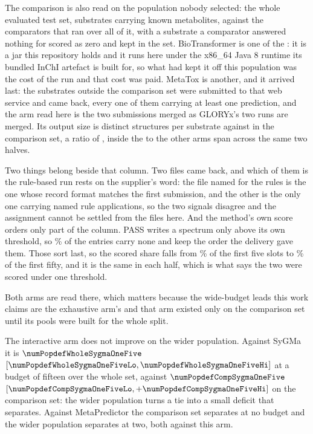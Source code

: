 \documentclass[journal=jcisd8,manuscript=suppinfo,layout=onecolumn]{achemso}
\begin{document}
The comparison is also read on the population nobody selected: the whole evaluated test set,
\numPopdefWholesubstrates{} substrates carrying \numPopdefWholereferences{} known metabolites, against
the \numPopdefWholearmsWord{} comparators that ran over all of it, with a substrate a comparator
answered nothing for scored as zero and kept in the set. BioTransformer is one of the \numPopdefWholearmsWord{}: it
is a jar this repository holds and it runs here under the x86\_64 Java 8 runtime its bundled
InChI artefact is built for, so what had kept it off this population was the cost of the run and
that cost was paid. MetaTox is another, and it arrived last: the
\numPopdefMetatoxoutsubmitted{} substrates outside the comparison set were submitted to that web
service and came back, every one of them carrying at least one prediction, and the arm
read here is the two submissions merged as GLORYx's two runs are merged. Its output size is
\numPopdefMetatoxoutdeliveryrate{} distinct structures per substrate against
\numPopdefMetatoxoutcomprate{} in the comparison set, a ratio of \numPopdefMetatoxoutratio{}, inside
the \numPopdefMetatoxoutpeerlo{} to \numPopdefMetatoxoutpeerhi{} the other
\numPopdefMetatoxoutpeerarmsWord{} arms span across the same two halves.

Two things belong beside that column. Two files came back, and which of them is the rule-based run
rests on the supplier's word: the file named for the rules is the one whose record format matches
the first submission, and the other is the only one carrying named rule applications, so the two
signals disagree and the assignment cannot be settled from the files here. And the method's own
score orders only part of the column. PASS writes a spectrum only above its own threshold, so
\numPopdefMetatoxscoredshare{}\% of the entries carry none and keep the order the delivery gave
them. Those sort last, so the scored share falls from \numPopdefMetatoxscoredfive{}\% of the first
five slots to \numPopdefMetatoxscoredfivezero{}\% of the first fifty, and it is the same in each
half, which is what says the two were scored under one threshold.

Both arms are read there, which matters
because the wide-budget
leads this work claims are the exhaustive arm's and that arm existed only on the comparison set
until its pools were built for the whole split.

The interactive arm does not improve on the wider population. Against SyGMa it is
$\numPopdefWholeSygmaOneFive$ $[\numPopdefWholeSygmaOneFiveLo,
\numPopdefWholeSygmaOneFiveHi]$ at a budget of fifteen over the whole set, against
$\numPopdefCompSygmaOneFive$ $[\numPopdefCompSygmaOneFiveLo, +\numPopdefCompSygmaOneFiveHi]$ on
the comparison set: the wider population turns a tie into a small deficit that separates. Against
MetaPredictor the comparison set separates at no budget and the wider population separates at two,
both against this arm.
\end{document}
